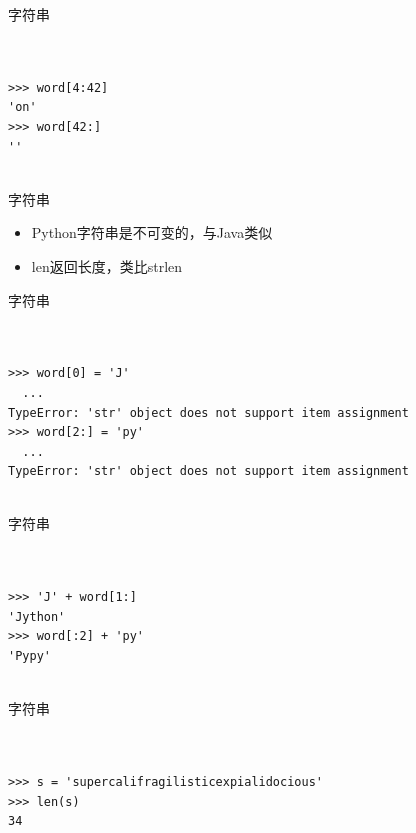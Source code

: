 \documentclass{beamer}
\begin{document}
\begin{frame}[t,fragile]{字符串}


\begin{verbatim}


>>> word[4:42]
'on'
>>> word[42:]
''


\end{verbatim}


\end{frame}


\begin{frame}[t]{字符串}

    \begin{itemize}
        \item Python字符串是不可变的，与Java类似
        \item len返回长度，类比strlen
    \end{itemize}

\end{frame}


\begin{frame}[t,fragile]{字符串}


\begin{verbatim}


>>> word[0] = 'J'
  ...
TypeError: 'str' object does not support item assignment
>>> word[2:] = 'py'
  ...
TypeError: 'str' object does not support item assignment


\end{verbatim}


\end{frame}



\begin{frame}[t,fragile]{字符串}


\begin{verbatim}


>>> 'J' + word[1:]
'Jython'
>>> word[:2] + 'py'
'Pypy'


\end{verbatim}


\end{frame}



\begin{frame}[t,fragile]{字符串}


\begin{verbatim}


>>> s = 'supercalifragilisticexpialidocious'
>>> len(s)
34


\end{verbatim}


\end{frame}
\end{document}
